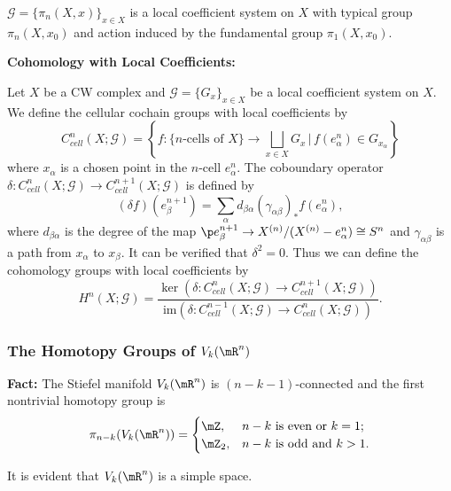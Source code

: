 \begin{example}
    $\mathcal{G} = \{\pi_n(X,x)\}_{x\in X}$ is a local coefficient system 
    on $X$ with typical group $\pi_n(X,x_0)$ and action induced by the 
    fundamental group $\pi_1(X,x_0)$.
\end{example}

\noindent\textbf{Cohomology with Local Coefficients:}

Let $X$ be a CW complex and $\mathcal{G} = \{G_x\}_{x\in X}$ be a local
coefficient system on $X$. We define the cellular cochain groups with local
coefficients by
\begin{equation*}
    C^n_{cell}(X;\mathcal{G}) = \left\{f:\big\{\text{$n$-cells of $X$}\big\}
    \to \bigsqcup_{x\in X}G_x \,\Big|\, f(e_\alpha^n)\in 
    G_{x_\alpha}\right\}
\end{equation*}
where $x_\alpha$ is a chosen point in the $n$-cell $e_\alpha^n$. The 
coboundary operator 
$\delta:C^n_{cell}(X;\mathcal{G})\to C^{n+1}_{cell}(X;\mathcal{G})$
is defined by 
\begin{equation*}
    (\delta f)(e_\beta^{n+1}) = \sum_\alpha d_{\beta\alpha}
    (\gamma_{\alpha\beta})_*f(e_\alpha^n),
\end{equation*}
where $d_{\beta\alpha}$ is the degree of the map 
$\p e_\beta^{n+1}\to X^{(n)}/(X^{(n)}-e^n_\alpha)\cong S^n$ and 
$\gamma_{\alpha\beta}$ is a path from $x_\alpha$ to $x_\beta$. It can be
verified that $\delta^2=0$. Thus we can define the cohomology groups with 
local coefficients by 
\begin{equation*}
    H^n(X;\mathcal{G}) = \frac{\ker(\delta:C^n_{cell}(X;\mathcal{G})\to 
    C^{n+1}_{cell}(X;\mathcal{G}))}{\mathrm{im}(\delta:C^{n-1}_{cell}(X;
    \mathcal{G})\to C^n_{cell}(X;\mathcal{G}))}.
\end{equation*}

\subsubsection*{The Homotopy Groups of $V_k(\mR^n)$}
\textbf{Fact:} The Stiefel manifold $V_k(\mR^n)$ is $(n-k-1)$-connected and 
the first nontrivial homotopy group is 
\begin{equation*}
    \pi_{n-k}(V_k(\mR^n)) = 
    \begin{cases}
        \mZ,& n-k \text{ is even or } k=1; \\
        \mZ_2,& n-k \text{ is odd and } k>1.
    \end{cases}
\end{equation*}
\begin{remark}
    It is evident that $V_k(\mR^n)$ is a simple space.
\end{remark}

